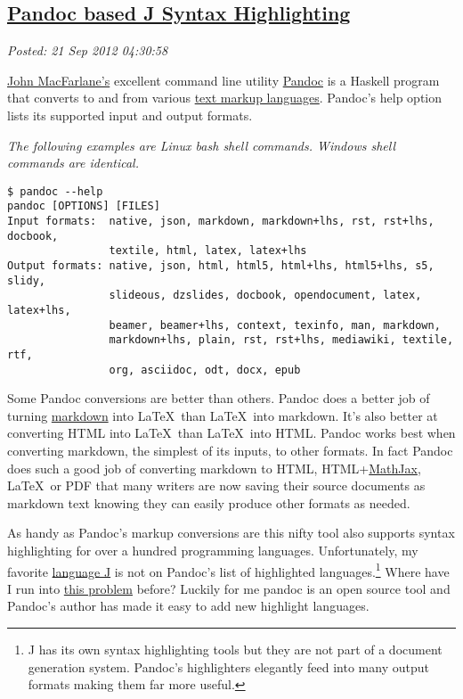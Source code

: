 %

\subsection*{\href{http://bakerjd99.wordpress.com/2012/09/20/pandoc-based-j-syntax-highlighting/}{Pandoc based J Syntax Highlighting}}

\noindent\emph{Posted: 21 Sep 2012 04:30:58}
\vspace{6pt}

\href{http://johnmacfarlane.net/}{John MacFarlane's} excellent command
line utility \href{http://johnmacfarlane.net/pandoc/}{Pandoc} is a Haskell program that converts to and from
various \href{http://en.wikipedia.org/wiki/Markup\_language}{text markup
languages}. Pandoc's help option lists its supported input and output
formats.

\emph{The following examples are Linux bash shell commands. Windows
shell commands are identical.}

\footnotesize
\begin{verbatim}
$ pandoc --help
pandoc [OPTIONS] [FILES]
Input formats:  native, json, markdown, markdown+lhs, rst, rst+lhs, docbook,
                textile, html, latex, latex+lhs
Output formats: native, json, html, html5, html+lhs, html5+lhs, s5, slidy,
                slideous, dzslides, docbook, opendocument, latex, latex+lhs,
                beamer, beamer+lhs, context, texinfo, man, markdown,
                markdown+lhs, plain, rst, rst+lhs, mediawiki, textile, rtf,
                org, asciidoc, odt, docx, epub
\end{verbatim}
\normalsize

Some Pandoc conversions are better than others. Pandoc does a better
job of turning \href{http://daringfireball.net/projects/markdown/syntax}{markdown} into
\LaTeX\ than \LaTeX\ into markdown. It's also better at converting HTML into
\LaTeX\ than \LaTeX\ into HTML. Pandoc works best when converting markdown,
the simplest of its inputs, to other formats. In fact Pandoc does such a
good job of converting markdown to HTML,
HTML+\href{http://www.mathjax.org/}{MathJax}, \LaTeX\ or PDF that many
writers are now saving their source documents as markdown text knowing
they can easily produce other formats as needed.

As handy as Pandoc's markup conversions are this nifty tool also
supports syntax highlighting for over a hundred programming languages.
Unfortunately, my favorite \href{http://www.jsoftware.com/}{language J}
is not on Pandoc's list of highlighted languages.\footnote{
J has its own syntax highlighting tools but they are not part of a
document generation system. Pandoc's highlighters elegantly feed into
many output formats making them far more useful.
} Where have I run 
into \href{http://bakerjd99.wordpress.com/2010/11/12/the-return-of-apl-fingers-2/}{this problem} before? Luckily for me pandoc is an open source tool and Pandoc's author has made it easy to add new highlight
languages.

